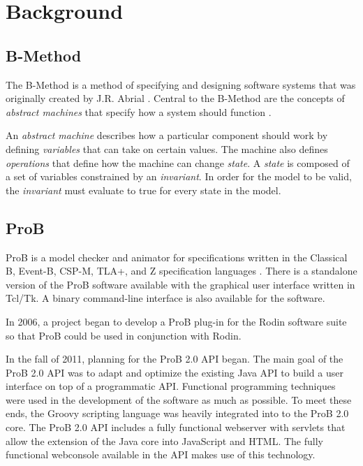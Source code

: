 \section{Background}

\subsection{B-Method}

The B-Method is a method of specifying and designing software systems that was originally created by J.R. Abrial \cite{abrial2005b}. Central to the B-Method are the concepts of \emph{abstract machines} that specify how a system should function \cite{schneider2001b}.

An \emph{abstract machine} describes how a particular component should work by defining \emph{variables} that can take on certain values. The machine also defines \emph{operations} that define how the machine can change \emph{state}. A \emph{state} is composed of a set of variables constrained by an \emph{invariant}. In order for the model to be valid, the \emph{invariant} must evaluate to true for every state in the model.

\subsection{ProB}

ProB is a model checker and animator for specifications written in the Classical B, Event-B, CSP-M, TLA+, and Z specification languages \cite{LeBu03_32}. There is a standalone version of the ProB software available with the graphical user interface written in Tcl/Tk. A binary command-line interface is also available for the software. 

In 2006, a project began to develop a ProB plug-in for the Rodin software suite so that ProB could be used in conjunction with Rodin. 

In the fall of 2011, planning for the ProB 2.0 API began.  The main goal of the ProB 2.0 API was to adapt and optimize the existing Java API to build a user interface on top of a programmatic API. Functional programming techniques were used in the development of the software as much as possible. To meet these ends, the Groovy scripting language was heavily integrated into to the ProB 2.0 core. The ProB 2.0 API includes a fully functional webserver with servlets that allow the extension of the Java core into JavaScript and HTML. The fully functional webconsole available in the API makes use of this technology.

